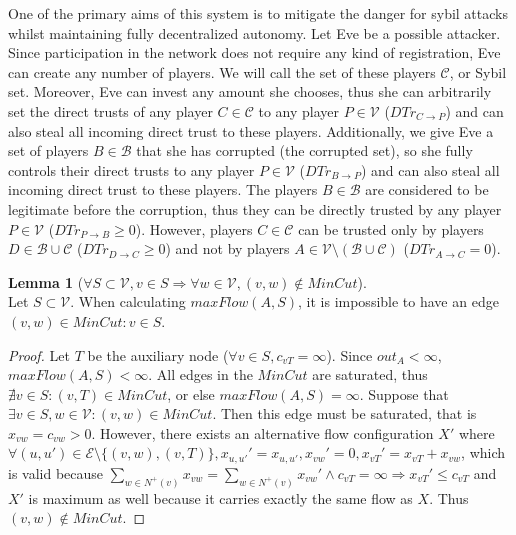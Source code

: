 \documentclass[11pt]{article}
\theoremstyle{definition}
\theoremstyle{corollary}
\theoremstyle{lemma}
\newtheorem{lemma}{Lemma}[section]
\begin{document}
    One of the primary aims of this system is to mitigate the danger for sybil attacks whilst maintaining fully decentralized
    autonomy. Let Eve be a possible attacker. Since participation in the network does not require any kind of registration,
    Eve can create any number of players. We will call the set of these players $\mathcal{C}$, or Sybil set. Moreover, Eve
    can invest any amount she chooses, thus she can arbitrarily set the direct trusts of any player $C \in \mathcal{C}$ to
    any player $P \in \mathcal{V}$ ($DTr_{C \rightarrow P}$) and can also steal all incoming direct trust to these players.
    Additionally, we give Eve a set of players $B \in \mathcal{B}$ that she has corrupted (the corrupted set), so she fully
    controls their direct trusts to any player $P \in \mathcal{V}$ ($DTr_{B \rightarrow P}$) and can also steal all incoming
    direct trust to these players. The players $B \in \mathcal{B}$ are considered to be legitimate before the corruption,
    thus they can be directly trusted by any player $P \in \mathcal{V}$ ($DTr_{P \rightarrow B} \geq 0$). However, players
    $C \in \mathcal{C}$ can be trusted only by players $D \in \mathcal{B} \cup \mathcal{C}$ ($DTr_{D \rightarrow C} \geq 0$)
    and not by players $A \in \mathcal{V} \setminus (\mathcal{B} \cup \mathcal{C})$ ($DTr_{A \rightarrow C} = 0$).
    \begin{lemma}[$\forall S \subset \mathcal{V}, v \in S \Rightarrow \forall w \in \mathcal{V}, (v,w) \notin MinCut$] \ \\
    \label{mincutmany}
       Let $S \subset \mathcal{V}$. When calculating $maxFlow(A, S)$, it is impossible to have an edge $(v,w) \in
       MinCut : v \in S$.
    \end{lemma}
    \begin{proof}
       Let $T$ be the auxiliary node ($\forall v \in S, c_{vT} = \infty$). Since $out_A < \infty$, $maxFlow(A, S)
       < \infty$. All edges in the $MinCut$ are saturated, thus $\nexists v \in S : (v,T) \in MinCut$, or else
       $maxFlow(A, S) = \infty$. Suppose that $\exists v \in S, w \in \mathcal{V} : (v,w) \in MinCut$. Then this
       edge must be saturated, that is $x_{vw} = c_{vw} > 0$. However, there exists an alternative flow configuration $X'$
       where $\forall (u,u') \in \mathcal{E} \setminus \{(v,w), (v,T)\}, x_{u,u'}' = x_{u,u'}, x_{vw}' = 0, x_{vT}' = x_{vT}
       + x_{vw}$, which is valid because $\sum\limits_{w \in N^{+}(v)}x_{vw} = \sum\limits_{w \in N^{+}(v)}x_{vw}' \wedge
       c_{vT} = \infty \Rightarrow x_{vT}' \leq c_{vT}$ and $X'$ is maximum as well because it carries exactly the same flow
       as $X$. Thus $(v,w) \notin MinCut$.
    \end{proof}
\end{document}
